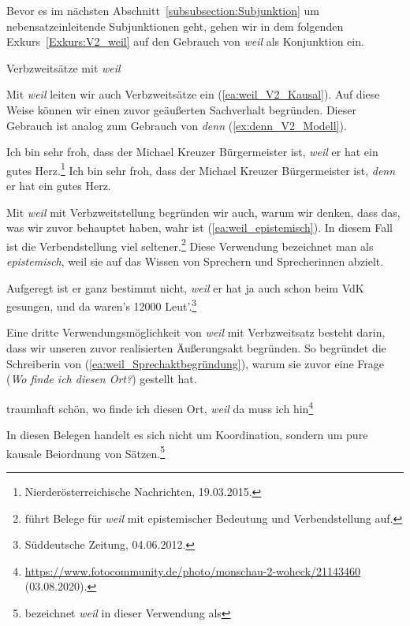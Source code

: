 Bevor es im nächsten Abschnitt~\ref{subsubsection:Subjunktion} um nebensatzeinleitende Subjunktionen geht, gehen wir in dem folgenden Exkurs~\ref{Exkurs:V2_weil} auf den Gebrauch von \textit{weil} als Konjunktion ein. 

\begin{Exkurs}{Verbzweitsätze mit \textit{weil}}\label{Exkurs:V2_weil}

Mit \textit{weil} leiten wir auch Verbzweitsätze ein (\ref{ea:weil_V2_Kausal}). Auf diese Weise können wir einen zuvor geäußerten Sachverhalt begründen. Dieser Gebrauch ist analog zum Gebrauch von \textit{denn} (\ref{ex:denn_V2_Modell}).  

\ea 
\ea \label{ea:weil_V2_Kausal} Ich bin sehr froh, dass der Michael Kreuzer Bürgermeister ist, \textit{weil} er hat ein gutes Herz.\footnote{Nierderösterreichische Nachrichten, 19.03.2015.}
\ex \label{ex:denn_V2_Modell} Ich bin sehr froh, dass der Michael Kreuzer Bürgermeister ist, \textit{denn} er hat ein gutes Herz.
\z 
\z 

Mit \textit{weil} mit Verbzweitstellung begründen wir auch, warum wir denken, dass das, was wir zuvor behauptet haben, wahr ist (\ref{ea:weil_epistemisch}). In diesem Fall ist die Verbendstellung viel seltener.\footnote{\citet[69]{Wegener2000} führt Belege für \textit{weil} mit epistemischer Bedeutung und Verbendstellung auf.} Diese Verwendung bezeichnet man als \textit{epistemisch}, weil sie auf das Wissen von Sprechern und Sprecherinnen abzielt.

\ea \label{ea:weil_epistemisch} Aufgeregt ist er ganz bestimmt nicht, \textit{weil} er hat ja auch schon beim VdK gesungen, und da waren's 12000 Leut'.\footnote{Süddeutsche Zeitung, 04.06.2012.}
\z 

Eine dritte Verwendungsmöglichkeit von \textit{weil} mit Verbzweitsatz besteht darin, dass wir unseren zuvor realisierten Äußerungsakt begründen. So begründet die Schreiberin von (\ref{ea:weil_Sprechaktbegründung}), warum sie zuvor eine Frage (\textit{Wo finde ich diesen Ort?}) gestellt hat.

\ea \label{ea:weil_Sprechaktbegründung} traumhaft schön, wo finde ich diesen Ort, \textit{weil} da muss ich hin\footnote{\url{https://www.fotocommunity.de/photo/monschau-2-woheck/21143460} (03.08.2020).}
\z 

In diesen Belegen handelt es sich nicht um Koordination, sondern um pure kausale Beiordnung von Sätzen.\footnote{\citet[280]{Hoehle19862018} bezeichnet \textit{weil} in dieser Verwendung als }


\end{Exkurs}
